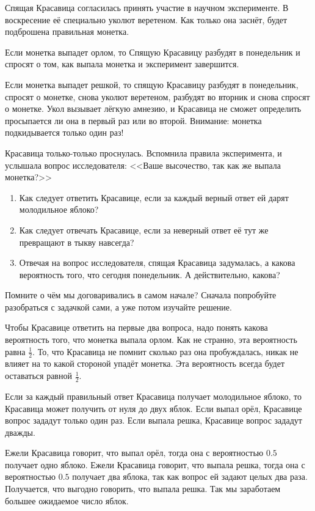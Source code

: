 \begin{chudo}
Спящая Красавица согласилась принять участие в научном эксперименте. В воскресение её специально уколют веретеном. Как только она заснёт, будет подброшена правильная монетка.

Если монетка выпадет орлом, то Спящую Красавицу разбудят в понедельник и спросят о том, как выпала монетка и эксперимент завершится.

Если монетка выпадет решкой, то спящую Красавицу разбудят в понедельник, спросят о монетке, снова уколют веретеном, разбудят во вторник и снова спросят о монетке. Укол вызывает лёгкую амнезию, и Красавица не сможет определить просыпается ли она в первый раз или во второй. Внимание: монетка подкидывается только один раз!

Красавица только-только проснулась. Вспомнила правила эксперимента, и услышала вопрос исследователя: <<Ваше высочество, так как же выпала монетка?>>

\begin{enumerate}
\item Как следует ответить Красавице, если за каждый верный ответ ей дарят молодильное яблоко?

\item Как следует отвечать Красавице, если за неверный ответ её тут же превращают в тыкву навсегда?

\item Отвечая на вопрос исследователя, спящая Красавица задумалась, а какова вероятность того, что сегодня понедельник. А действительно, какова?
\end{enumerate}
\end{chudo}

Помните о чём мы договаривались в самом начале? Сначала попробуйте разобраться с задачкой сами, а уже потом изучайте решение. 

Чтобы Красавице ответить на первые два вопроса, надо понять какова вероятность того, что монетка выпала орлом. Как не странно, эта вероятность равна $\frac{1}{2}$. То, что Красавица не помнит сколько раз она пробуждалась, никак не влияет на то какой стороной упадёт монетка. Эта вероятность всегда будет оставаться равной $\frac{1}{2}$.

Если за каждый правильный ответ Красавица получает молодильное яблоко, то Красавица может получить от нуля до двух яблок. Если выпал орёл, Красавице вопрос зададут только один раз. Если выпала решка, Красавице вопрос зададут дважды.

Ежели Красавица говорит, что выпал орёл, тогда она с вероятностью $0.5$ получает одно яблоко. Ежели Красавица говорит, что выпала решка, тогда она с вероятностью $0.5$ получает два яблока, так как вопрос ей задают целых два раза. Получается, что выгодно говорить, что выпала решка. Так мы заработаем большее ожидаемое число яблок.

